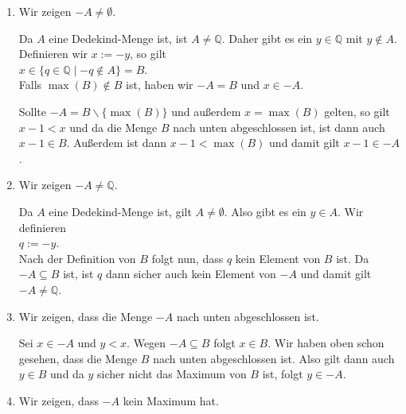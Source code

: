\begin{enumerate}
\item Wir zeigen $-\!A \not= \emptyset$.

      Da $A$ eine Dedekind-Menge ist, ist $A \not= \mathbb{Q}$.  Daher gibt es ein $y \in \mathbb{Q}$ 
      mit $y \not\in A$.  Definieren wir $x := -y$, so gilt
      \\[0.2cm]
      \hspace*{1.3cm}
      $x \in \{ q \in \mathbb{Q} \mid -q \not\in A \} = B$.
      \\[0.2cm]
      Falls $\max(B) \not\in B$ ist, haben wir $-A = B$ und $x \in -A$.

      Sollte $-A = B \backslash \{ \max(B) \}$ und au\ss{}erdem $x = \max(B)$ gelten, so gilt $x-1 < x$ und da die Menge $B$ nach unten
      abgeschlossen ist, ist dann auch $x-1 \in B$.  Au\ss{}erdem ist dann  $x - 1 < \max(B)$ und damit
      gilt $x-1 \in -A$.
\item Wir zeigen $-\!A \not= \mathbb{Q}$.

      Da $A$ eine Dedekind-Menge ist, gilt $A \not= \emptyset$.  Also gibt es ein $y \in A$.
      Wir definieren
      \\[0.2cm]
      \hspace*{1.3cm}
      $q := -y$.
      \\[0.2cm]
      Nach der Definition von $B$ folgt nun, dass $q$ kein Element von $B$ ist.
      Da $-A \subseteq B$ ist, ist $q$ dann sicher auch kein Element von $-A$ und damit 
      gilt $-\!A \not= \mathbb{Q}$.
\item Wir zeigen, dass die Menge $-\!A$ nach unten abgeschlossen ist.
  
      Sei $x \in -A$ und $y < x$.  Wegen $-A \subseteq B$ folgt $x \in B$.
      Wir haben oben schon gesehen, dass die Menge $B$ nach unten abgeschlossen ist.
      Also gilt dann auch $y \in B$ und da $y$ sicher nicht das Maximum von $B$ ist, folgt 
      $y \in -A$.
\item Wir zeigen, dass $-\!A$ kein Maximum hat.


\end{enumerate}
